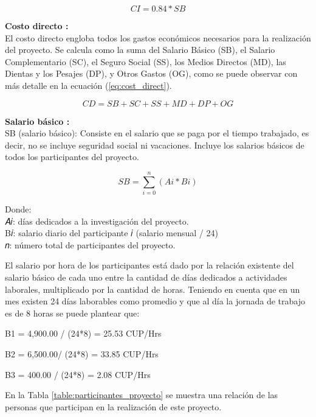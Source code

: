 \begin{equation}
    \label{eq:cost_indirect}
    CI = 0.84 * SB
\end{equation}

\textbf{Costo directo :}\\
El costo directo engloba todos los gastos económicos necesarios para la realización del proyecto. Se
calcula como la suma del Salario Básico (SB), el Salario Complementario (SC), el Seguro Social (SS), los
Medios Directos (MD), las Dientas y los Pesajes (DP), y Otros Gastos (OG), como se puede observar con más
detalle en la ecuación (\ref{eq:cost_direct}).

\begin{equation}
    \label{eq:cost_direct}
    CD = SB + SC + SS + MD + DP + OG
\end{equation}

\textbf{Salario básico :}\\
SB (salario básico): Consiste en el salario que se paga por el tiempo trabajado, es decir, no se incluye seguridad social ni vacaciones. Incluye los salarios básicos de todos los participantes del proyecto.


\begin{equation}
    \label{eq:sal_basico}
    SB = \sum_{i = 0}^{n} (Ai * Bi)
\end{equation}

Donde:\\
𝐴𝑖: días dedicados a la investigación del proyecto.\\
B𝑖: salario diario del participante 𝑖 (salario mensual / 24)\\
𝑛: número total de participantes del proyecto.

El salario por hora de los participantes está dado por la relación existente del salario
básico de cada uno entre la cantidad de días dedicados a actividades laborales,
multiplicado por la cantidad de horas. Teniendo en cuenta que en un mes existen 24
días laborables como promedio y que al día la jornada de trabajo es de 8 horas se
puede plantear que:

B1 = 4,900.00 / (24*8) = 25.53 CUP/Hrs

B2 = 6,500.00/ (24*8) = 33.85 CUP/Hrs

B3 = 400.00 / (24*8) = 2.08 CUP/Hrs

En la Tabla \ref{table:participantes_proyecto} se muestra una relación de las personas que participan en la realización de este proyecto.

\vspace{2cm}

